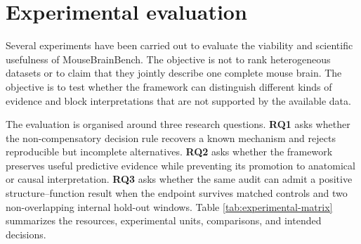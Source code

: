 \section{Experimental evaluation}
\label{sec:evaluation}

Several experiments have been carried out to evaluate the viability and
scientific usefulness of MouseBrainBench. The objective is not to rank
heterogeneous datasets or to claim that they jointly describe one complete mouse
brain. The objective is to test whether the framework can distinguish different
kinds of evidence and block interpretations that are not supported by the
available data.

The evaluation is organised around three research questions. \textbf{RQ1} asks
whether the non-compensatory decision rule recovers a known mechanism and
rejects reproducible but incomplete alternatives. \textbf{RQ2} asks whether the
framework preserves useful predictive evidence while preventing its promotion to
anatomical or causal interpretation. \textbf{RQ3} asks whether the same audit can
admit a positive structure--function result when the endpoint survives matched
controls and two non-overlapping internal hold-out windows. Table
\ref{tab:experimental-matrix} summarizes the resources, experimental units,
comparisons, and intended decisions.

